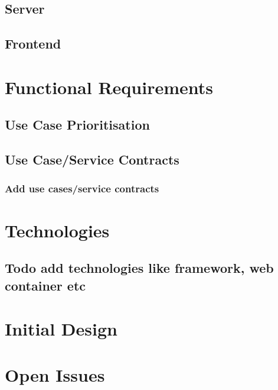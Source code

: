 \documentclass{article}
\begin{document}
\subsection{Server}

\subsection{Frontend}

\section{Functional Requirements}

\subsection{Use Case Prioritisation}

\subsection{Use Case/Service Contracts}

\subsubsection{Add use cases/service contracts}

\section{Technologies}

\subsection{Todo add technologies like framework, web container etc}

\section{Initial Design}

\section{Open Issues}
\end{document}
